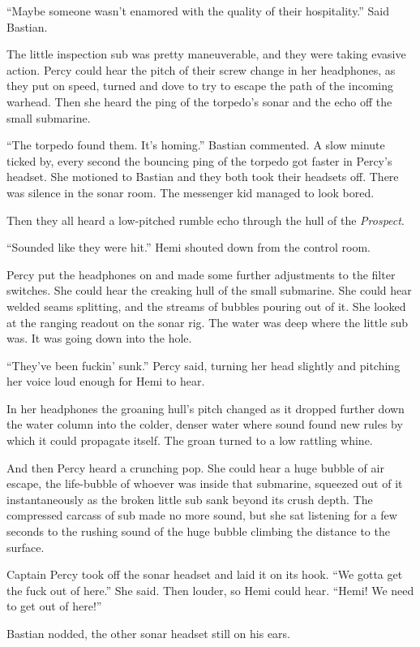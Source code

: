 \documentclass[
]{scrbook}
\begin{document}
``Maybe someone wasn't enamored with the quality of their hospitality.''
Said Bastian.

The little inspection sub was pretty maneuverable, and they were taking
evasive action. Percy could hear the pitch of their screw change in her
headphones, as they put on speed, turned and dove to try to escape the
path of the incoming warhead. Then she heard the ping of the torpedo's
sonar and the echo off the small submarine.

``The torpedo found them. It's homing.'' Bastian commented. A slow
minute ticked by, every second the bouncing ping of the torpedo got
faster in Percy's headset. She motioned to Bastian and they both took
their headsets off. There was silence in the sonar room. The messenger
kid managed to look bored.

Then they all heard a low-pitched rumble echo through the hull of the
\emph{Prospect}.

``Sounded like they were hit.'' Hemi shouted down from the control room.

Percy put the headphones on and made some further adjustments to the
filter switches. She could hear the creaking hull of the small
submarine. She could hear welded seams splitting, and the streams of
bubbles pouring out of it. She looked at the ranging readout on the
sonar rig. The water was deep where the little sub was. It was going
down into the hole.

``They've been fuckin' sunk.'' Percy said, turning her head slightly and
pitching her voice loud enough for Hemi to hear.

In her headphones the groaning hull's pitch changed as it dropped
further down the water column into the colder, denser water where sound
found new rules by which it could propagate itself. The groan turned to
a low rattling whine.

And then Percy heard a crunching pop. She could hear a huge bubble of
air escape, the life-bubble of whoever was inside that submarine,
squeezed out of it instantaneously as the broken little sub sank beyond
its crush depth. The compressed carcass of sub made no more sound, but
she sat listening for a few seconds to the rushing sound of the huge
bubble climbing the distance to the surface.

Captain Percy took off the sonar headset and laid it on its hook. ``We
gotta get the fuck out of here.'' She said. Then louder, so Hemi could
hear. ``Hemi! We need to get out of here!''

Bastian nodded, the other sonar headset still on his ears.
\end{document}
